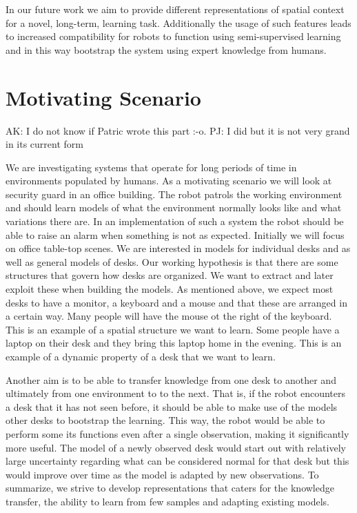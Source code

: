 \documentclass[letterpaper, 10 pt, conference]{ieeeconf}  %
\begin{document}
In our future work we aim to provide different representations of spatial context for a novel, long-term, learning task. Additionally the 
usage of such features leads to increased compatibility for robots to function using semi-supervised learning and in this way bootstrap the 
system using expert knowledge from humans.


\section{Motivating Scenario}
\label{sec:Motivating Scenario}

{\color{blue} AK: I do not know if Patric wrote this part :-o.}
{\color{red} PJ: I did but it is not very grand in its current form}

We are investigating systems that operate for long periods of time in environments populated by humans. 
As a motivating scenario we will look at security guard in an office building. The robot patrols the working environment and should learn 
models of what the environment normally looks like and what variations there are. In an implementation of such a system the robot should be 
able to raise an alarm when something is not as expected. Initially we will focus on office table-top scenes. We are interested in models 
for individual desks and as well as general models of desks. Our working hypothesis is that there are some structures that govern how desks 
are organized. We want to extract and later exploit these when building the models. As mentioned above, we expect most desks to have a 
monitor, a keyboard and a mouse and that these are arranged in a certain way. Many people will have the mouse ot the right of the keyboard. This is an example of a spatial structure we want to learn. Some people have a laptop on their desk and they bring this 
laptop home in the evening. This is an example of a dynamic property of a desk that we want to learn.

Another aim is to be able to transfer knowledge from one desk to another and ultimately from one environment to to the next. That is, if the 
robot encounters a desk that it has not seen before, it should be able to make use of the models other desks to bootstrap the learning. This 
way, the robot would be able to perform some its functions even after a single observation, making it significantly more useful. The model 
of a newly observed desk would start out with relatively large uncertainty regarding what can be considered normal for that desk but this 
would improve over time as the model is adapted by new observations. To summarize, we strive to develop representations that caters for the 
knowledge transfer, the ability to learn from few samples and adapting existing models.
\end{document}
